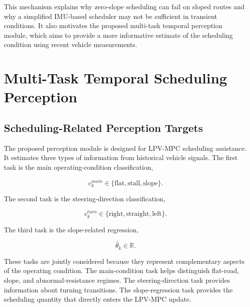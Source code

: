 \documentclass{ieeeaccess}
\begin{document}
This mechanism explains why zero-slope scheduling can fail on sloped routes and why a simplified IMU-based scheduler may not be sufficient in transient conditions. It also motivates the proposed multi-task temporal perception module, which aims to provide a more informative estimate of the scheduling condition using recent vehicle measurements.



\section{Multi-Task Temporal Scheduling Perception}

\label{sec:temporal_perception}



\subsection{Scheduling-Related Perception Targets}



The proposed perception module is designed for LPV-MPC scheduling assistance. It estimates three types of information from historical vehicle signals. The first task is the main operating-condition classification,

\begin{equation}
c^{main}_k \in \{\mathrm{flat},\mathrm{stall},\mathrm{slope}\}.
\label{eq:main_condition}
\end{equation}

The second task is the steering-direction classification,

\begin{equation}
c^{turn}_k \in \{\mathrm{right},\mathrm{straight},\mathrm{left}\}.
\label{eq:turn_condition}
\end{equation}

The third task is the slope-related regression,

\begin{equation}
\hat{\theta}_k \in \mathbb{R}.
\label{eq:theta_regression}
\end{equation}



These tasks are jointly considered because they represent complementary aspects of the operating condition. The main-condition task helps distinguish flat-road, slope, and abnormal-resistance regimes. The steering-direction task provides information about turning transitions. The slope-regression task provides the scheduling quantity that directly enters the LPV-MPC update.
\end{document}
